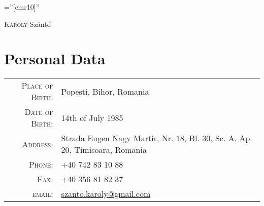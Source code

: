 \documentclass[a4paper,10pt]{article}
\begin{document}
\pagestyle{plain} %

\font\fb=''[cmr10]'' %

 
\par{\centering
		{\Huge \textsc{K\'aroly} Sz\'ant\'o
	}\bigskip\par}
	
\section{Personal Data}

\begin{tabular}{rl}
    \textsc{Place of Birth:} & Popesti, Bihor, Romania\\
    \textsc{Date of Birth:}  & 14th of July 1985 \\
    \textsc{Address:}         & Strada Eugen Nagy Martir, Nr. 18, Bl. 30, Sc. A, Ap. 20, Timisoara, Romania\\
    \textsc{Phone:}     	 & +40 742 83 10 88\\
    \textsc{Fax:}			 & +40 356 81 82 37\\
    \textsc{email:}     	 &
    \href{mailto:szanto.karoly@gmail.com}{szanto.karoly@gmail.com}
\end{tabular}

\end{document}
